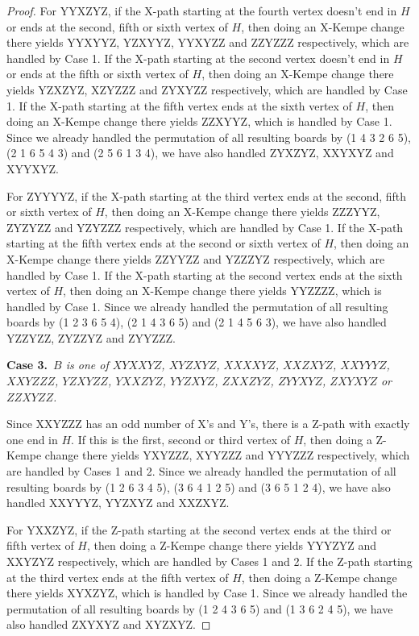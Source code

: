 \documentclass[12pt]{article}
\theoremstyle{plain}
\theoremstyle{definition}
\theoremstyle{remark}
\newcommand{\case}[2]{{\bf Case #1.}~{\it #2}~~}
\begin{document}
\begin{proof}
	For YYXZYZ, if the X-path starting at the fourth vertex doesn't end in $H$ or ends at the second, fifth or sixth vertex of $H$, then doing an X-Kempe change there yields YYXYYZ, YZXYYZ, YYXYZZ and ZZYZZZ respectively, which are handled by Case 1.
	If the X-path starting at the second vertex doesn't end in $H$ or ends at the fifth or sixth vertex of $H$, then doing an X-Kempe change there yields YZXZYZ, XZYZZZ and ZYXYZZ respectively, which are handled by Case 1.
	If the X-path starting at the fifth vertex ends at the sixth vertex of $H$, then doing an X-Kempe change there yields ZZXYYZ, which is handled by Case 1.
	Since we already handled the permutation of all resulting boards by (1 4 3 2 6 5), (2 1 6 5 4 3) and (2 5 6 1 3 4), we have also handled ZYXZYZ, XXYXYZ and XYYXYZ.
	
	
	For ZYYYYZ, if the X-path starting at the third vertex ends at the second, fifth or sixth vertex of $H$, then doing an X-Kempe change there yields ZZZYYZ, ZYZYZZ and YZYZZZ respectively, which are handled by Case 1.
	If the X-path starting at the fifth vertex ends at the second or sixth vertex of $H$, then doing an X-Kempe change there yields ZZYYZZ and YZZZYZ respectively, which are handled by Case 1.
	If the X-path starting at the second vertex ends at the sixth vertex of $H$, then doing an X-Kempe change there yields YYZZZZ, which is handled by Case 1.
	Since we already handled the permutation of all resulting boards by (1 2 3 6 5 4), (2 1 4 3 6 5) and (2 1 4 5 6 3), we have also handled YZZYZZ, ZYZZYZ and ZYYZZZ.
	
	
	\case{3}{$B$ is one of $XYXXYZ$, $XYZXYZ$, $XXXXYZ$, $XXZXYZ$, $XXYYYZ$, $XXYZZZ$, $YZXYZZ$, $YXXZYZ$, $YYZXYZ$, $ZXXZYZ$, $ZYYXYZ$, $ZXYXYZ$ or $ZZXYZZ$.}
	
	Since XXYZZZ has an odd number of X's and Y's, there is a Z-path with exactly one end in $H$.
	If this is the first, second or third vertex of $H$, then doing a Z-Kempe change there yields YXYZZZ, XYYZZZ and YYYZZZ respectively, which are handled by Cases 1 and 2.
	Since we already handled the permutation of all resulting boards by (1 2 6 3 4 5), (3 6 4 1 2 5) and (3 6 5 1 2 4), we have also handled XXYYYZ, YYZXYZ and XXZXYZ.
	
	
	For YXXZYZ, if the Z-path starting at the second vertex ends at the third or fifth vertex of $H$, then doing a Z-Kempe change there yields YYYZYZ and XXYZYZ respectively, which are handled by Cases 1 and 2.
	If the Z-path starting at the third vertex ends at the fifth vertex of $H$, then doing a Z-Kempe change there yields XYXZYZ, which is handled by Case 1.
	Since we already handled the permutation of all resulting boards by (1 2 4 3 6 5) and (1 3 6 2 4 5), we have also handled ZXYXYZ and XYZXYZ.
	

\end{proof}
\end{document}
